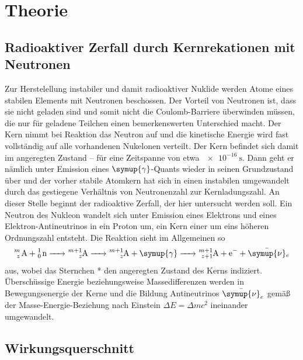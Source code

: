 \section{Theorie}
\label{sec:Theorie}

\subsection{Radioaktiver Zerfall durch Kernrekationen mit Neutronen}

Zur Herstelellung instabiler und damit radioaktiver Nuklide werden Atome eines stabilen Elements mit Neutronen beschossen. 
Der Vorteil von Neutronen ist, dass sie nicht geladen sind und somit nicht die Coulomb-Barriere überwinden müssen, die nur 
für geladene Teilchen einen bemerkenswerten Unterschied macht. 
Der Kern nimmt bei Reaktion das Neutron auf und die kinetische Energie wird fast vollständig auf alle vorhandenen Nukelonen 
verteilt. Der Kern befindet sich damit im angeregten Zustand -- für eine Zeitspanne von etwa $\SI{e-16}{\second}$. 
Dann geht er nämlich unter Emission eines $\symup{\gamma}$-Quants wieder in seinen Grundzustand über und der vorher stabile 
Atomkern hat sich in einen instabilen umgewandelt durch das gestiegene Verhältnis von Neutronenzahl zur Kernladungszahl. 
An dieser Stelle beginnt der radioaktive Zerfall, der hier untersucht werden soll. 
Ein Neutron des Nukleon wandelt sich unter Emission eines Elektrons und eines Elektron-Antineutrinos in ein Proton um, 
ein Kern einer um eins höheren Ordnungszahl entsteht. 
Die Reaktion sieht im Allgemeinen so
\begin{equation}
    \ce{^m_z A + ^1_0 n -> ^{m+1}_zA\* -> ^{m+1}_zA  +\symup{\gamma} -> ^{m+1}_{z+1}A +e- + \bar{\symup{\nu}}_e}
    \label{eqn:allgZerfall}
\end{equation}
aus, wobei das Sternchen * den angeregten Zustand des Kerns indiziert.
Überschüssige Energie beziehungsweise Massedifferenzen werden in Bewegungsenergie der Kerne und die Bildung Antineutrinos $\bar{\symup{\nu}}_e$ 
gemäß der Masse-Energie-Beziehung nach Einstein $\Delta E=\Delta m c^2$ ineinander umgewandelt.

\subsection{Wirkungsquerschnitt}

